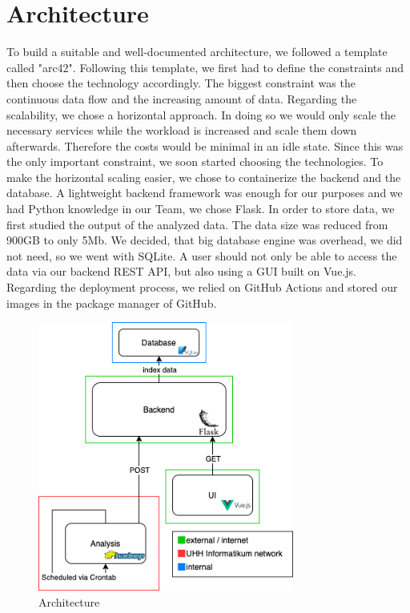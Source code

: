 \documentclass[
    fontsize=12pt,
    headings=small,
    parskip=half,           %
    bibliography=totoc,
    numbers=noenddot,       %
    open=any,               %
    ]{scrreprt}
\begin{document}
\section{Architecture}
To build a suitable and well-documented architecture, we followed a template called "arc42". Following this template, we first had to define the constraints and then choose the technology accordingly. The biggest constraint was the continuous data flow and the increasing amount of data. Regarding the scalability, we chose a horizontal approach. In doing so we would only scale the necessary services while the workload is increased and scale them down afterwards. Therefore the costs would be minimal in an idle state. Since this was the only important constraint, we soon started choosing the technologies. To make the horizontal scaling easier, we chose to containerize the backend and the database. A lightweight backend  framework was enough for our purposes and we had Python knowledge in our Team, we chose Flask. In order to store data, we first studied the output of the analyzed data. The data size was reduced from 900GB to only 5Mb. We decided, that big database engine was overhead, we did not need, so we went with SQLite. A user should not only be able to access the data via our backend REST API, but also using a GUI built on Vue.js. Regarding the deployment process, we relied on GitHub Actions and stored our images in the package manager of GitHub.

\begin{figure}[h]
    \centering
    \includegraphics[width=0.75\textwidth]{ArchitectureEng.png}
    \caption{Architecture}
\end{figure}
\end{document}

